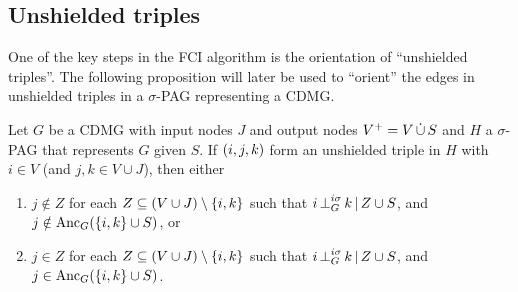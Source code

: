 \subsection{Unshielded triples}

One of the key steps in the FCI algorithm is the orientation of ``unshielded triples''.
The following proposition will later be used to ``orient'' the edges in unshielded triples in a $\sigma$-PAG representing a CDMG.
\begin{Prp}\label{prp:orienting_unshielded_triples}
  Let $G$ be a CDMG with input nodes $J$ and output nodes $V^+ = V \,\dot{\cup}\, S$ and $H$ a $\sigma$-PAG that represents $G$ given $S$.
  If $\left ( i, j, k \right )$ form an unshielded triple in $H$ with $i \in V$ (and $j,k \in V \cup J$), then either 
  \begin{enumerate}[label=(\roman*)]
    \item $j \notin Z$ for each $Z \subseteq (V \cup J) \setminus \{i,k\}$ such that $i \operatorname*{\perp}^{i\sigma}_G k \operatorname*{|} Z \cup S$, and $j \notin \mathrm{Anc}_G(\{i,k\} \cup S)$, or
    \item $j \in Z$ for each $Z \subseteq (V \cup J) \setminus \{i,k\}$ such that $i \operatorname*{\perp}^{i\sigma}_G k \operatorname*{|} Z \cup S$, and $j \in \mathrm{Anc}_G(\{i,k\} \cup S)$.
  \end{enumerate}
\end{Prp}
